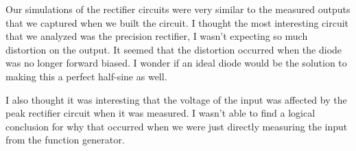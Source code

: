 \documentclass{../../ece-report}
\begin{document}
Our simulations of the rectifier circuits were very
similar to the measured outputs that we captured when
we built the circuit. I thought the most interesting
circuit that we analyzed was the precision rectifier,
I wasn't expecting so much distortion on the output.
It seemed that the distortion occurred when the diode
was no longer forward biased. I wonder if an ideal diode
would be the solution to making this a perfect half-sine
as well.

I also thought it was interesting that the voltage of
the input was affected by the peak rectifier circuit when
it was measured. I wasn't able to find a logical conclusion
for why that occurred when we were just directly measuring
the input from the function generator.
\end{document}
